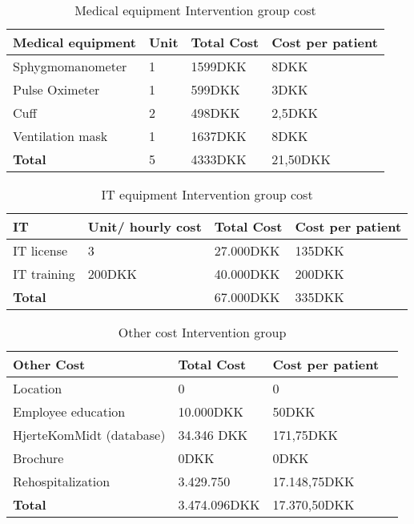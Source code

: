 \begin{table}[H]
\begin{longtabu} to \linewidth{l l l l }
    \textbf{Medical equipment} & \textbf{Unit} &\textbf{Total Cost} & \textbf{Cost per patient} \\[-1ex]
    \midrule
    Sphygmomanometer  & 1  &1599DKK & 8DKK  \\ \hline
    Pulse Oximeter    &  1 & 599DKK &   3DKK \\ \hline 
    Cuff    &  2 & 498DKK  & 2,5DKK  \\ \hline 
    Ventilation mask   &  1 & 1637DKK  &   8DKK \\
    \hline \hline \hline
    \textbf{Total} & 5 & 4333DKK & 21,50DKK
    \newline
    \newline
   \end{longtabu}
\caption{Medical equipment Intervention group cost}
\label{tab: MeI}
\end{table}

\begin{table}[H]
\begin{longtabu} to \linewidth{l l l l }
    \textbf{IT} & \textbf{Unit/ hourly cost} &\textbf{Total Cost} & \textbf{Cost per patient} \\[-1ex]
    \midrule
    IT license  & 3  & 27.000DKK  & 135DKK  \\ \hline
    IT training & 200DKK & 40.000DKK & 200DKK \\
    \hline \hline \hline
    \textbf{Total} &  & 67.000DKK & 335DKK
    \newline
    \newline
   \end{longtabu}
\caption{IT equipment Intervention group cost}
\label{tab: II}
\end{table}

\begin{table}[H]
\begin{longtabu} to 
    \textbf{Other Cost} &\textbf{Total Cost} & \textbf{Cost per patient} \\[-1ex]
    \midrule
    Location   &  0 & 0 \\ \hline
    Employee education   & 10.000DKK & 50DKK  \\ \hline
    HjerteKomMidt (database)  & 34.346 DKK &   171,75DKK \\ \hline
    Brochure & 0DKK & 0DKK \\ \hline
    Rehospitalization & 3.429.750 & 17.148,75DKK \\
    \hline \hline \hline
    \textbf{Total} & 3.474.096DKK  & 17.370,50DKK
    \newline
    \newline
   \end{longtabu}
\caption{Other cost Intervention group}
\label{tab: OI}
\end{table}

